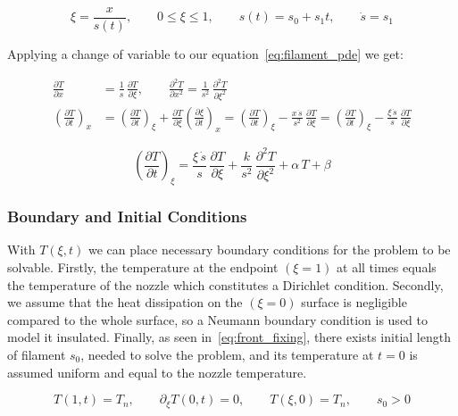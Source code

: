 \begin{equation}
\label{eq:front_fixing}
\xi = \frac{x}{s(t)}, \qquad 0 \le \xi \le 1, \qquad
s(t) = s_0 + s_1 t, \qquad \dot s = s_1
\end{equation}

Applying a change of variable to our equation~\eqref{eq:filament_pde} we get:

\begin{equation*}
\begin{aligned}
\frac{\partial T}{\partial x} &= \frac{1}{s}\,\frac{\partial T}{\partial \xi},
\qquad
\frac{\partial^2 T}{\partial x^2} = \frac{1}{s^2}\,\frac{\partial^2 T}{\partial \xi^2} \\
\left(\frac{\partial T}{\partial t}\right)_{\!x}
&= \left(\frac{\partial T}{\partial t}\right)_{\!\xi} + \frac{\partial T}{\partial \xi}\left(\frac{\partial \xi}{\partial t}\right)_{\!x}
= \left(\frac{\partial T}{\partial t}\right)_{\!\xi} - \frac{x\,\dot s}{s^2}\,\frac{\partial T}{\partial \xi}
= \left(\frac{\partial T}{\partial t}\right)_{\!\xi} - \frac{\xi\,\dot s}{s}\,\frac{\partial T}{\partial \xi}
\end{aligned}
\end{equation*}

\begin{equation}
\label{eq:filament_pde_fixed}
\boxed{\left(\frac{\partial T}{\partial t}\right)_{\!\xi}
= \frac{\xi\,\dot s}{s}\,\frac{\partial T}{\partial \xi}
+ \frac{k}{s^2}\,\frac{\partial^2 T}{\partial \xi^2}
+ \alpha\,T + \beta}
\end{equation}

\subsubsection*{Boundary and Initial Conditions}

With $T(\xi, t)$ we can place necessary boundary conditions for the problem to be solvable. Firstly, the temperature at the endpoint $(\xi = 1)$ at all times equals the temperature of the nozzle which constitutes a Dirichlet condition. Secondly, we assume that the heat dissipation on the $(\xi = 0)$ surface is negligible compared to the whole surface, so a Neumann boundary condition is used to model it insulated. Finally, as seen in~\eqref{eq:front_fixing}, there exists initial length of filament $s_0$, needed to solve the problem, and its temperature at $t=0$ is assumed uniform and equal to the nozzle temperature.

\begin{equation}
\label{eq:filament_bc}
T(1, t) = T_n, \qquad
\partial_\xi T(0, t) = 0, \qquad
T(\xi, 0) = T_n, \qquad
s_0 > 0
\end{equation}


